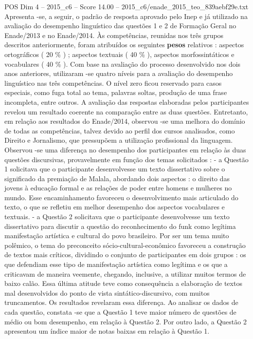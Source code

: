 \begin{textsample}{POS Dim 4 – 2015\_c6 – Score 14.00 – 2015\_c6/enade\_2015\_teo\_839aebf29e.txt}
Apresenta -se, a seguir, o padrão de resposta aprovado pelo Inep e já utilizado na avaliação do desempenho linguístico das questões 1 e 2 de Formação Geral no Enade/2013 e no Enade/2014.
Às competências, reunidas nos três grupos descritos anteriormente, foram atribuídos os seguintes \textbf{pesos} relativos : aspectos ortográficos ( 20 \% ) ; aspectos textuais ( 40 \% ), aspectos morfossintáticos e vocabulares ( 40 \% ).
Com base na avaliação do processo desenvolvido nos dois anos anteriores, utilizaram -se quatro níveis para a avaliação do desempenho linguístico nas três competências.
O nível zero ficou reservado para casos especiais, como fuga total ao tema, palavras soltas, produção de uma frase incompleta, entre outros.
A avaliação das respostas elaboradas pelos participantes revelou um resultado coerente na comparação entre as duas questões.
Entretanto, em relação aos resultados do Enade/2014, observou -se uma melhora do domínio de todas as competências, talvez devido ao perfil dos cursos analisados, como Direito e Jornalismo, que pressupõem a utilização profissional da linguagem.
Observou -se uma diferença no desempenho dos participantes em relação às duas questões discursivas, provavelmente em função dos temas solicitados : - a Questão 1 solicitava que o participante desenvolvesse um texto dissertativo sobre o significado da premiação de Malala, abordando dois aspectos : o direito das jovens à educação formal e as relações de poder entre homens e mulheres no mundo.
Esse encaminhamento favoreceu o desenvolvimento mais articulado do texto, o que se refletiu em melhor desempenho dos aspectos vocabulares e textuais. - a Questão 2 solicitava que o participante desenvolvesse um texto dissertativo para discutir a questão do reconhecimento do funk como legítima manifestação artística e cultural do povo brasileiro.
Por ser um tema muito polêmico, o tema do preconceito sócio-cultural-econômico favoreceu a construção de textos mais críticos, dividindo o conjunto de participantes em dois grupos : os que defendiam esse tipo de manifestação artística como legítima e os que a criticavam de maneira veemente, chegando, inclusive, a utilizar muitos termos de baixo calão.
Essa última atitude teve como consequência a elaboração de textos mal desenvolvidos do ponto de vista sintático-discursivo, com muitos truncamentos.
Os resultados revelaram essa diferença.
Ao analisar os dados de cada questão, constata -se que a Questão 1 teve maior número de questões de médio ou bom desempenho, em relação à Questão 2.
Por outro lado, a Questão 2 apresentou um índice maior de notas baixas em relação à Questão 1.

\end{textsample}
